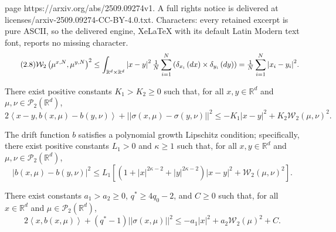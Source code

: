 \documentclass[10pt,a4paper]{amsart}
\begin{document}
page https://arxiv.org/abs/2509.09274v1. A full rights notice is delivered at licenses/arxiv-2509.09274-CC-BY-4.0.txt. Characters: every retained excerpt is pure ASCII, so the delivered engine, XeLaTeX with its default Latin Modern text font, reports no missing character.
\begin{equation}\tag{2.8}\label{2.8}
\mathcal{W}_{2}\left( \mu ^{x,N},\mu ^{y,N} \right)^{2}
\leq \int_{\mathbb{R} ^d\times \mathbb{R} ^d}\left|x-y\right|^2\tfrac{1}{N}\sum_{i=1}^N{\left( \delta _{x_i}\left( dx \right) \times \delta _{y_i}\left( dy \right) \right)}\\
=\tfrac{1}{N}\sum_{i=1}^N{\left| x_i-y_i \right|^2}.
\end{equation}

\begin{assumption}\label{ass2.1}
There exist positive constants $K_1>K_2\geq 0$ such that, for all $x, y \in \mathbb{R}^d$ and $\mu, \nu \in \mathcal{P}_2\left(\mathbb{R}^d\right)$,
\begin{equation}\tag{2.10}\label{2.10}
2\left\langle x-y, b\left(x, \mu\right)-b\left(y, \nu\right)\right\rangle+\left|\left|\sigma\left(x, \mu\right)-\sigma\left(y, \nu\right)\right|\right|^2 \leq-K_1\left|x-y\right|^2+K_2 \mathcal{W}_2\left(\mu, \nu\right)^2.
\end{equation}
\end{assumption}

\begin{assumption}\label{ass2.2}
The drift function $b$ satisfies a polynomial growth Lipschitz condition; specifically, there exist positive constants $L_1 > 0$ and $\kappa \geq 1$ such that, for all $x, y \in \mathbb{R}^d$ and $\mu, \nu \in \mathcal{P}_2\left(\mathbb{R}^d\right)$,
\begin{equation}\tag{2.11}\label{2.11}
\left|b\left( x,\mu \right) -b\left( y,\nu \right) \right|^2\leq L_1\left[ \left( 1+\left|x\right|^{2\kappa -2}+\left|y\right|^{2\kappa -2} \right) \left|x-y\right|^2+\mathcal{W}_2\left( \mu ,\nu \right) ^2 \right].
\end{equation}
\end{assumption}

\begin{assumption}\label{ass2.4}
There exist constants $a_1>a_2\geq 0$, $q^*\geq 4q_0-2$, and $C\geq 0$ such that, for all $x \in \mathbb{R}^d$ and $\mu \in \mathcal{P}_2\left(\mathbb{R}^d\right)$,
\begin{equation}\tag{2.13}\label{2.13}
2\left\langle x, b\left(x, \mu\right)\right\rangle+\left(q^*-1\right)\left|\left|\sigma\left(x, \mu\right)\right|\right|^2 \leq-a_1\left|x\right|^2+a_2 \mathcal{W}_2\left(\mu\right)^2+C.
\end{equation}
\end{assumption}
\end{document}

